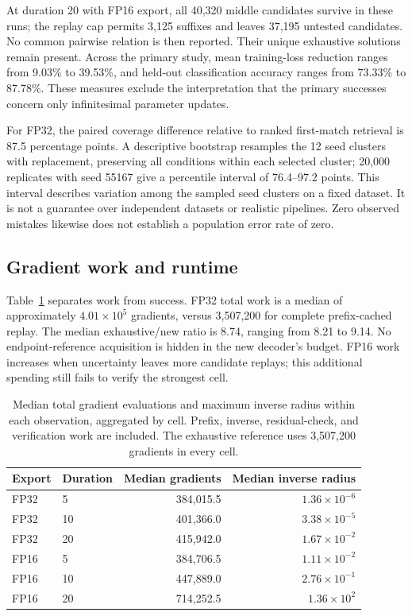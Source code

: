 At duration 20 with FP16 export, all 40,320 middle candidates survive in these runs; the replay cap permits 3,125 suffixes and leaves 37,195 untested candidates. No common pairwise relation is then reported. Their unique exhaustive solutions remain present. Across the primary study, mean training-loss reduction ranges from 9.03\% to 39.53\%, and held-out classification accuracy ranges from 73.33\% to 87.78\%. These measures exclude the interpretation that the primary successes concern only infinitesimal parameter updates.

For FP32, the paired coverage difference relative to ranked first-match retrieval is 87.5 percentage points. A descriptive bootstrap resamples the 12 seed clusters with replacement, preserving all conditions within each selected cluster; 20,000 replicates with seed 55167 give a percentile interval of 76.4--97.2 points. This interval describes variation among the sampled seed clusters on a fixed dataset. It is not a guarantee over independent datasets or realistic pipelines. Zero observed mistakes likewise does not establish a population error rate of zero.

\subsection{Gradient work and runtime}
Table~\ref{tab:work} separates work from success. FP32 total work is a median of approximately $4.01\times10^5$ gradients, versus 3,507,200 for complete prefix-cached replay. The median exhaustive/new ratio is 8.74, ranging from 8.21 to 9.14. No endpoint-reference acquisition is hidden in the new decoder's budget. FP16 work increases when uncertainty leaves more candidate replays; this additional spending still fails to verify the strongest cell.

\begin{table}[t]
\centering
\caption{Median total gradient evaluations and maximum inverse radius within each observation, aggregated by cell. Prefix, inverse, residual-check, and verification work are included. The exhaustive reference uses 3,507,200 gradients in every cell.}\label{tab:work}
\begin{tabular}{llrr}
\toprule
Export & Duration & Median gradients & Median inverse radius\\
\midrule
FP32 & 5 & 384,015.5 & $1.36\times10^{-6}$\\
FP32 & 10 & 401,366.0 & $3.38\times10^{-5}$\\
FP32 & 20 & 415,942.0 & $1.67\times10^{-2}$\\
FP16 & 5 & 384,706.5 & $1.11\times10^{-2}$\\
FP16 & 10 & 447,889.0 & $2.76\times10^{-1}$\\
FP16 & 20 & 714,252.5 & $1.36\times10^{2}$\\
\bottomrule
\end{tabular}
\end{table}

